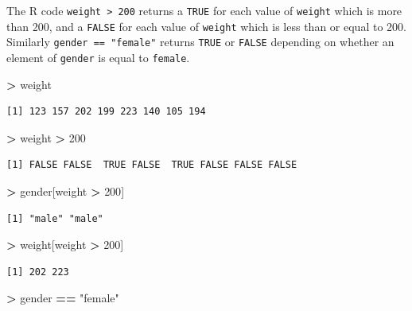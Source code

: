 \documentclass[]{krantz}
\makeatletter
\newenvironment{Shaded}{\begin{snugshade}}{\end{snugshade}}
\newcommand{\DecValTok}[1]{\textcolor[rgb]{0.06,0.06,0.06}{#1}}
\newcommand{\StringTok}[1]{\textcolor[rgb]{0.5,0.5,0.5}{#1}}
\newcommand{\OperatorTok}[1]{\textcolor[rgb]{0.43,0.43,0.43}{\textbf{#1}}}
\newcommand{\NormalTok}[1]{#1}
\newenvironment{kframe}{%
\medskip{}
\setlength{\fboxsep}{.8em}
 \def\at@end@of@kframe{}%
 \ifinner\ifhmode%
  \def\at@end@of@kframe{\end{minipage}}%
  \begin{minipage}{\columnwidth}%
 \fi\fi%
 \def\FrameCommand##1{\hskip\@totalleftmargin \hskip-\fboxsep
 \colorbox{shadecolor}{##1}\hskip-\fboxsep
     \hskip-\linewidth \hskip-\@totalleftmargin \hskip\columnwidth}%
 \MakeFramed {\advance\hsize-\width
   \@totalleftmargin\z@ \linewidth\hsize
   \@setminipage}}%
 {\par\unskip\endMakeFramed%
 \at@end@of@kframe}
\renewenvironment{Shaded}{\begin{kframe}}{\end{kframe}}
\makeatother
\begin{document}
The R code \texttt{weight\ \textgreater{}\ 200} returns a \texttt{TRUE}
for each value of \texttt{weight} which is more than 200, and a
\texttt{FALSE} for each value of \texttt{weight} which is less than or
equal to 200. Similarly \texttt{gender\ ==\ "female"} returns
\texttt{TRUE} or \texttt{FALSE} depending on whether an element of
\texttt{gender} is equal to \texttt{female}.

\begin{Shaded}
\begin{Highlighting}[]
\OperatorTok{>}\StringTok{ }\NormalTok{weight}
\end{Highlighting}
\end{Shaded}

\begin{verbatim}
[1] 123 157 202 199 223 140 105 194
\end{verbatim}

\begin{Shaded}
\begin{Highlighting}[]
\OperatorTok{>}\StringTok{ }\NormalTok{weight }\OperatorTok{>}\StringTok{ }\DecValTok{200}
\end{Highlighting}
\end{Shaded}

\begin{verbatim}
[1] FALSE FALSE  TRUE FALSE  TRUE FALSE FALSE FALSE
\end{verbatim}

\begin{Shaded}
\begin{Highlighting}[]
\OperatorTok{>}\StringTok{ }\NormalTok{gender[weight }\OperatorTok{>}\StringTok{ }\DecValTok{200}\NormalTok{]}
\end{Highlighting}
\end{Shaded}

\begin{verbatim}
[1] "male" "male"
\end{verbatim}

\begin{Shaded}
\begin{Highlighting}[]
\OperatorTok{>}\StringTok{ }\NormalTok{weight[weight }\OperatorTok{>}\StringTok{ }\DecValTok{200}\NormalTok{]}
\end{Highlighting}
\end{Shaded}

\begin{verbatim}
[1] 202 223
\end{verbatim}

\begin{Shaded}
\begin{Highlighting}[]
\OperatorTok{>}\StringTok{ }\NormalTok{gender }\OperatorTok{==}\StringTok{ "female"}
\end{Highlighting}
\end{Shaded}
\end{document}
